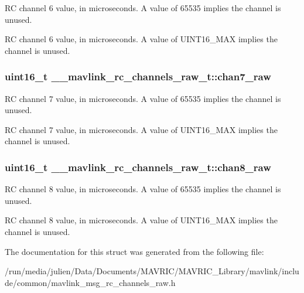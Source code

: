 R\+C channel 6 value, in microseconds. A value of 65535 implies the channel is unused. 

R\+C channel 6 value, in microseconds. A value of U\+I\+N\+T16\+\_\+\+M\+A\+X implies the channel is unused. \hypertarget{struct____mavlink__rc__channels__raw__t_a6cccd33a0b2b888a3671e66e0c88d799}{
\subsubsection[{chan7\+\_\+raw}]{\setlength{\rightskip}{0pt plus 5cm}uint16\+\_\+t \+\_\+\+\_\+mavlink\+\_\+rc\+\_\+channels\+\_\+raw\+\_\+t\+::chan7\+\_\+raw}}\label{struct____mavlink__rc__channels__raw__t_a6cccd33a0b2b888a3671e66e0c88d799}


R\+C channel 7 value, in microseconds. A value of 65535 implies the channel is unused. 

R\+C channel 7 value, in microseconds. A value of U\+I\+N\+T16\+\_\+\+M\+A\+X implies the channel is unused. \hypertarget{struct____mavlink__rc__channels__raw__t_ac4181e5b2c297dbe24431a4ca1d1493e}{
\subsubsection[{chan8\+\_\+raw}]{\setlength{\rightskip}{0pt plus 5cm}uint16\+\_\+t \+\_\+\+\_\+mavlink\+\_\+rc\+\_\+channels\+\_\+raw\+\_\+t\+::chan8\+\_\+raw}}\label{struct____mavlink__rc__channels__raw__t_ac4181e5b2c297dbe24431a4ca1d1493e}


R\+C channel 8 value, in microseconds. A value of 65535 implies the channel is unused. 

R\+C channel 8 value, in microseconds. A value of U\+I\+N\+T16\+\_\+\+M\+A\+X implies the channel is unused. 

The documentation for this struct was generated from the following file\+:\begin{DoxyCompactItemize}
\item 
/run/media/julien/\+Data/\+Documents/\+M\+A\+V\+R\+I\+C/\+M\+A\+V\+R\+I\+C\+\_\+\+Library/mavlink/include/common/mavlink\+\_\+msg\+\_\+rc\+\_\+channels\+\_\+raw.\+h\end{DoxyCompactItemize}
